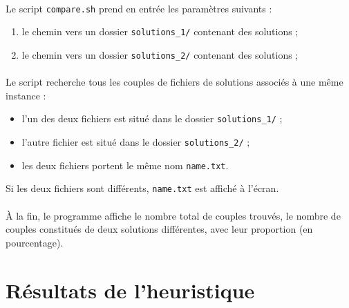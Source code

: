 \paragraph{}
Le script \texttt{compare.sh} prend en entrée les paramètres suivants :
\begin{enumerate}
\item le chemin vers un dossier \texttt{solutions\_1/} contenant des solutions ;
\item le chemin vers un dossier \texttt{solutions\_2/} contenant des solutions ;
\end{enumerate}
\paragraph{}
Le script recherche tous les couples de fichiers de solutions associés à une même instance :
\begin{itemize}
\item l'un des deux fichiers est situé dans le dossier \texttt{solutions\_1/} ;
\item l'autre fichier est situé dans le dossier \texttt{solutions\_2/} ;
\item les deux fichiers portent le même nom \texttt{name.txt}.
\end{itemize}
Si les deux fichiers sont différents, \texttt{name.txt} est affiché à l'écran.
\paragraph{}
À la fin, le programme affiche le nombre total de couples trouvés, le nombre de couples constitués de deux solutions différentes,
avec leur proportion (en pourcentage).


\section{Résultats de l'heuristique}

